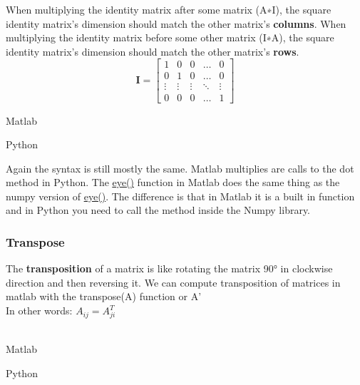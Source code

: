When multiplying the identity matrix after some matrix (A∗I), the square identity matrix's dimension should match the other matrix's \textbf{columns}. When multiplying the identity matrix before some other matrix (I∗A), the square identity matrix's dimension should match the other matrix's \textbf{rows}.\\

\begin{equation}
  \textbf{I} = \left[
    \begin{matrix}
      1 & 0 & 0 & \dots  & 0 \\
      0 & 1 & 0 & \dots  & 0 \\
      \vdots & \vdots & \vdots & \ddots & \vdots \\
      0 & 0 & 0 & \dots  & 1
    \end{matrix}
    \right]
  \label{eqn:IdentityMatrix}
\end{equation}

\newpage
\begin{multicols}{2}
  Matlab\\
  \columnbreak

  Python\\
  
\end{multicols}

Again the syntax is still mostly the same.  Matlab multiplies are calls to the dot method in Python.  The \underline{\href{https://www.mathworks.com/help/matlab/ref/eye.html}{eye()}} function in Matlab does the same thing as the numpy version of \underline{\href{https://docs.scipy.org/doc/numpy/reference/generated/numpy.eye.htm}{eye()}}.  The difference is that in Matlab it is a built in function and in Python you need to call the method inside the Numpy library.

\subsubsection{Transpose}

The \textbf{transposition} of a matrix is like rotating the matrix 90° in clockwise direction and then reversing it. We can compute transposition of matrices in matlab with the transpose(A) function or A'\\

In other words: $A_{ij} = A^T_{ji}$  \\

​ \begin{multicols}{2}
  Matlab\\
  \columnbreak

  Python\\
  
\end{multicols}	

